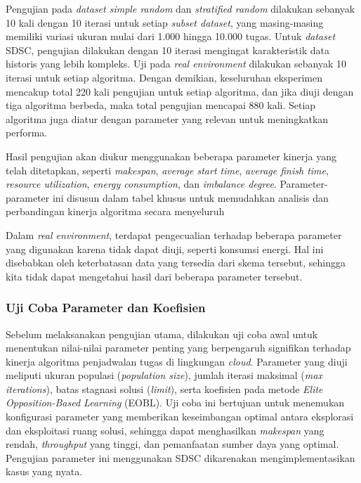 Pengujian pada \textit{dataset simple random} dan \textit{stratified random} dilakukan sebanyak 10 kali dengan 10 iterasi untuk setiap \textit{subset dataset}, yang masing-masing memiliki variasi ukuran mulai dari 1.000 hingga 10.000 tugas. Untuk \textit{dataset} SDSC, pengujian dilakukan dengan 10 iterasi mengingat karakteristik data historis yang lebih kompleks. Uji pada \textit{real environment} dilakukan sebanyak 10 iterasi untuk setiap algoritma. Dengan demikian, keseluruhan eksperimen mencakup total 220 kali pengujian untuk setiap algoritma, dan jika diuji dengan tiga algoritma berbeda, maka total pengujian mencapai 880 kali. Setiap algoritma juga diatur dengan parameter yang relevan untuk meningkatkan performa.

Hasil pengujian akan diukur menggunakan beberapa parameter kinerja yang telah ditetapkan, seperti \textit{makespan}, \textit{average start time}, \textit{average finish time}, \textit{resource utilization}, \textit{energy consumption}, dan \textit{imbalance degree}. Parameter-parameter ini disusun dalam tabel khusus untuk memudahkan analisis dan perbandingan kinerja algoritma secara menyeluruh

Dalam \textit{real environment}, terdapat pengecualian terhadap beberapa parameter yang digunakan karena tidak dapat diuji, seperti konsumsi energi. Hal ini disebabkan oleh keterbatasan data yang tersedia dari skema tersebut, sehingga kita tidak dapat mengetahui hasil dari beberapa parameter tersebut.

\subsubsection{Uji Coba Parameter dan Koefisien}
Sebelum melaksanakan pengujian utama, dilakukan uji coba awal untuk menentukan nilai-nilai parameter penting yang berpengaruh signifikan terhadap kinerja algoritma penjadwalan tugas di lingkungan \textit{cloud}. Parameter yang diuji meliputi ukuran populasi (\textit{population size}), jumlah iterasi maksimal (\textit{max iterations}), batas stagnasi solusi (\textit{limit}), serta koefisien pada metode \textit{Elite Opposition-Based Learning} (EOBL). Uji coba ini bertujuan untuk menemukan konfigurasi parameter yang memberikan keseimbangan optimal antara eksplorasi dan eksploitasi ruang solusi, sehingga dapat menghasilkan \textit{makespan} yang rendah, \textit{throughput} yang tinggi, dan pemanfaatan sumber daya yang optimal. Pengujian parameter ini menggunakan SDSC dikarenakan mengimplementasikan kasus yang nyata.


